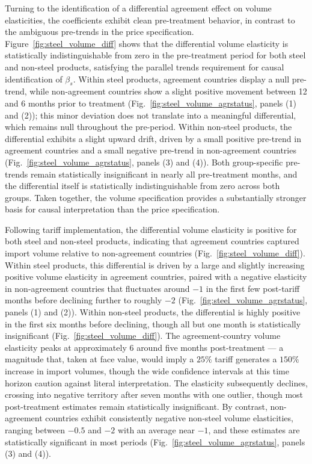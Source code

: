 Turning to the identification of a differential agreement effect on volume elasticities, the coefficients exhibit clean pre-treatment behavior, in contrast to the ambiguous pre-trends in the price specification. Figure~\ref{fig:steel_volume_diff} shows that the differential volume elasticity is statistically indistinguishable from zero in the pre-treatment period for both steel and non-steel products, satisfying the parallel trends requirement for causal identification of $\beta_s$. Within steel products, agreement countries display a null pre-trend, while non-agreement countries show a slight positive movement between 12 and 6 months prior to treatment (Fig.~\ref{fig:steel_volume_agrstatus}, panels (1) and (2)); this minor deviation does not translate into a meaningful differential, which remains null throughout the pre-period. Within non-steel products, the differential exhibits a slight upward drift, driven by a small positive pre-trend in agreement countries and a small negative pre-trend in non-agreement countries (Fig.~\ref{fig:steel_volume_agrstatus}, panels (3) and (4)). Both group-specific pre-trends remain statistically insignificant in nearly all pre-treatment months, and the differential itself is statistically indistinguishable from zero across both groups. Taken together, the volume specification provides a substantially stronger basis for causal interpretation than the price specification.

Following tariff implementation, the differential volume elasticity is positive for both steel and non-steel products, indicating that agreement countries captured import volume relative to non-agreement countries (Fig.~\ref{fig:steel_volume_diff}). Within steel products, this differential is driven by a large and slightly increasing positive volume elasticity in agreement countries, paired with a negative elasticity in non-agreement countries that fluctuates around $-1$ in the first few post-tariff months before declining further to roughly $-2$ (Fig.~\ref{fig:steel_volume_agrstatus}, panels (1) and (2)). Within non-steel products, the differential is highly positive in the first six months before declining, though all but one month is statistically insignificant (Fig.~\ref{fig:steel_volume_diff}). The agreement-country volume elasticity peaks at approximately 6 around five months post-treatment --- a magnitude that, taken at face value, would imply a $25\%$ tariff generates a $150\%$ increase in import volumes, though the wide confidence intervals at this time horizon caution against literal interpretation. The elasticity subsequently declines, crossing into negative territory after seven months with one outlier, though most post-treatment estimates remain statistically insignificant. By contrast, non-agreement countries exhibit consistently negative non-steel volume elasticities, ranging between $-0.5$ and $-2$ with an average near $-1$, and these estimates are statistically significant in most periods (Fig.~\ref{fig:steel_volume_agrstatus}, panels (3) and (4)).

